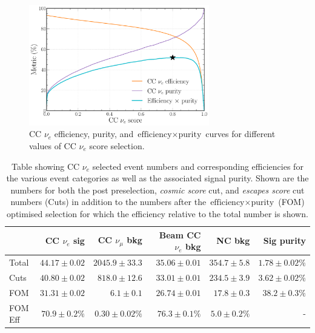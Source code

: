 \begin{figure} %
    \includegraphics[width=0.7\textwidth]{diagrams/7-results/final_nuel_eff_curves.pdf}
    \caption[CC $\nu_{e}$ efficiency, purity, and $\text{efficiency}\times\text{purity}$ curves]
    {CC $\nu_{e}$ efficiency, purity, and $\text{efficiency}\times\text{purity}$ curves for
        different values of CC $\nu_{e}$ score selection.}
    \label{fig:final_nuel_eff_curves}
\end{figure}

\begin{table}
    \begin{tabular}{lrrrrr}
                 & CC $\nu_{e}$ sig & CC $\nu_{\mu}$ bkg & Beam CC $\nu_{e}$ bkg & NC bkg & Sig purity     \\
        \midrule
        Total & $44.17\pm0.02$  & $2045.9\pm33.3$  & $35.06\pm0.01$  & $354.7\pm5.8$  & $1.78\pm0.02\%$  \\
        Cuts  & $40.80\pm0.02$  & $818.0\pm12.6$   & $33.01\pm0.01$  & $234.5\pm3.9$  & $3.62\pm0.02\%$  \\
        FOM   & $31.31\pm0.02$  & $6.1\pm0.1$      & $26.74\pm0.01$  & $17.8\pm0.3$   & $38.2\pm0.3\%$ \\
        \midrule
        FOM Eff & $70.9\pm0.2\%$ & $0.30\pm0.02\%$ & $76.3\pm0.1\%$  & $5.0\pm0.2\%$  & -  \\
    \end{tabular}
    \caption[Table showing CC $\nu_{e}$ selected event numbers, efficiencies and signal purity]
    {Table showing CC $\nu_{e}$ selected event numbers and corresponding efficiencies for the
        various event categories as well as the associated signal purity. Shown are the numbers
        for both the post preselection, \emph{cosmic score} cut, and \emph{escapes score} cut
        numbers (Cuts) in addition to the numbers after the       
        $\text{efficiency}\times\text{purity}$ (FOM) optimised selection for which the efficiency
        relative to the total number is shown.}
    \label{tab:nuel_selection}
\end{table}

